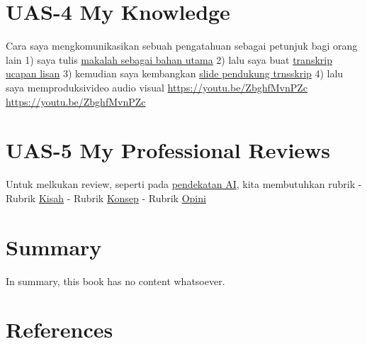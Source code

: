 \documentclass[
  letterpaper,
  DIV=11,
  numbers=noendperiod]{scrreprt}
\begin{document}

\chapter{UAS-4 My Knowledge}\label{uas-4-my-knowledge}

Cara saya mengkomunikasikan sebuah pengatahuan sebagai petunjuk bagi
orang lain 1) saya tulis
\href{Rekomendasi\%20Presentasi\%20Efektif(Contoh\%20Makalah).pdf}{makalah
sebagai bahan utama} 2) lalu saya buat
\href{Contoh\%20Transkrip\%20Presentasi.pdf}{transkrip ucapan lisan} 3)
kemudian saya kembangkan
\href{Rekomendasi\%20Presentasi\%20(Contoh\%20Slides).pdf}{slide
pendukung trnsskrip} 4) lalu saya memproduksivideo audio visual
\url{https://youtu.be/ZbghfMvnPZc} \url{https://youtu.be/ZbghfMvnPZc}


\chapter{UAS-5 My Professional
Reviews}\label{uas-5-my-professional-reviews}

Untuk melkukan review, seperti pada
\href{../My_Personal_Reviews/Doc.5.Mengevaluasi-Esai-Berdasarkan-Rubrik.pdf}{pendekatan
AI}, kita membutuhkan rubrik - Rubrik
\href{Dok.4.a.Rubrik_Kisah.pdf}{Kisah} - Rubrik
\href{Dok.4.b.Rubrik_Konsep.pdf}{Konsep} - Rubrik
\href{Dok.4.c.Rubrik_Opini.pdf}{Opini}


\chapter{Summary}\label{summary}

In summary, this book has no content whatsoever.


\chapter*{References}\label{references}


\label{refs}
\end{document}
